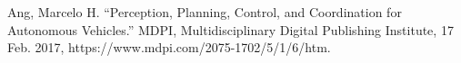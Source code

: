 \documentclass[onecolumn, draftclsnofoot,10pt]{IEEEtran}
\begin{document}
\bigskip
\bigskip
\bigskip

\begin{thebibliography}{99}

Ang, Marcelo H. “Perception, Planning, Control, and Coordination for Autonomous Vehicles.” MDPI, Multidisciplinary Digital Publishing Institute, 17 Feb. 2017, https://www.mdpi.com/2075-1702/5/1/6/htm.

\end{thebibliography}
\end{document}
